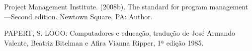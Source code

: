 \documentclass[
12pt,		%
openright,	%
twoside,  %
a4paper,			%
chapter=TITLE,		%
english,			%
french,				%
spanish,			%
brazil				%
]{USPSC-classe/USPSC}
\begin{document}
\begin{flushleft}
\begin{flushleft}
\begin{flushleft}
\begin{flushleft}
\begin{flushleft}
\begin{flushleft}
\begin{flushleft}
\begin{flushleft}
[PMI, 2008] Project Management Institute. (2008b). The standard for program management—Second edition. Newtown Square, PA: Author.
\end{flushleft}


\end{flushleft}


\end{flushleft}


\end{flushleft}


\end{flushleft}


\end{flushleft}


\end{flushleft}


\end{flushleft}


\begin{flushleft}
\begin{flushleft}
\begin{flushleft}
\begin{flushleft}
\begin{flushleft}
\begin{flushleft}
\begin{flushleft}
\begin{flushleft}
[PAPERT, 1980] PAPERT, S. LOGO: Computadores e educa\c{c}\~ao, tradu\c{c}\~ao de Jos\'e Armando Valente, Beatriz Bitelman e Afira Vianna Ripper, 1ª edi\c{c}\~ao 1985.
\end{flushleft}


\end{flushleft}


\end{flushleft}


\end{flushleft}


\end{flushleft}


\end{flushleft}


\end{flushleft}


\end{flushleft}
\end{document}
